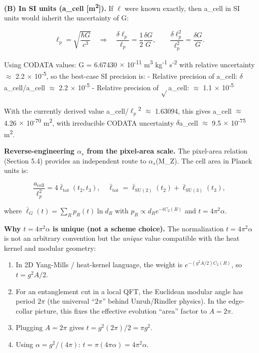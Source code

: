 \documentclass[11pt,a4paper]{article}
\theoremstyle{remark}
\begin{document}
\textbf{(B) In SI units (a\_cell {[}m\textsuperscript{2}{]}).} If \ensuremath{\ell} were known exactly, then a\_cell in SI units would inherit the uncertainty of G:

\[
\ell_p = \sqrt{\frac{\hbar G}{c^3}} \quad \Rightarrow \quad
\frac{\delta \ell_p}{\ell_p} = \frac{1}{2}\frac{\delta G}{G}, \qquad
\frac{\delta \ell_p^2}{\ell_p^2} = \frac{\delta G}{G}.
\]

Using CODATA values: G = 6.67430 \ensuremath{\times} 10\textsuperscript{-11} m\textsuperscript{3} kg\textsuperscript{-1} s\textsuperscript{-2} with relative uncertainty \ensuremath{\approx} 2.2 \ensuremath{\times} 10\textsuperscript{-5}, so the best-case SI precision is:
- Relative precision of a\_cell: \ensuremath{\delta}a\_cell/a\_cell \ensuremath{\approx} 2.2 \ensuremath{\times} 10\textsuperscript{-5}
- Relative precision of \ensuremath{\sqrt{}}a\_cell: \ensuremath{\approx} 1.1 \ensuremath{\times} 10\textsuperscript{-5}

With the currently derived value a\_cell/$\ell_p$\textsuperscript{2} \ensuremath{\approx} 1.63094, this gives a\_cell \ensuremath{\approx} 4.26 \ensuremath{\times} 10\textsuperscript{-70} m\textsuperscript{2}, with irreducible CODATA uncertainty \ensuremath{\delta}a\_cell \ensuremath{\approx} 9.5 \ensuremath{\times} 10\textsuperscript{-75} m\textsuperscript{2}.

\textbf{Reverse-engineering $\alpha_s$ from the pixel-area scale.} The pixel-area relation
(Section 5.4) provides an independent route to $\alpha_s$(M\_Z). The cell area in
Planck units is:

\[
\frac{a_{\mathrm{cell}}}{\ell_p^2} = 4 \bar{\ell}_{\mathrm{tot}}(t_2, t_3),
\quad
\bar{\ell}_{\mathrm{tot}} = \bar{\ell}_{\mathrm{SU}(2)}(t_2) + \bar{\ell}_{\mathrm{SU}(3)}(t_3),
\]

where \(\bar{\ell}_G(t) = \sum_R p_R(t) \ln d_R\) with \(p_R \propto d_R e^{-t C_2(R)}\)
and \(t = 4\pi^2 \alpha\).

\textbf{Why \(t = 4\pi^2 \alpha\) is unique (not a scheme choice).} The normalization
\(t = 4\pi^2 \alpha\) is not an arbitrary convention but the \emph{unique} value
compatible with the heat kernel and modular geometry:

\begin{enumerate}
\def\labelenumi{\arabic{enumi}.}
\item
  In 2D Yang-Mills / heat-kernel language, the weight is
  \(e^{-(g^2 A/2) C_2(R)}\), so \(t = g^2 A / 2\).
\item
  For an entanglement cut in a local QFT, the Euclidean modular angle has
  period \(2\pi\) (the universal ``\(2\pi\)'' behind Unruh/Rindler physics). In
  the edge-collar picture, this fixes the effective evolution ``area'' factor
  to \(A = 2\pi\).
\item
  Plugging \(A = 2\pi\) gives \(t = g^2 (2\pi)/2 = \pi g^2\).
\item
  Using \(\alpha = g^2/(4\pi)\): \(t = \pi (4\pi \alpha) = 4\pi^2 \alpha\).
\end{enumerate}
\end{document}
